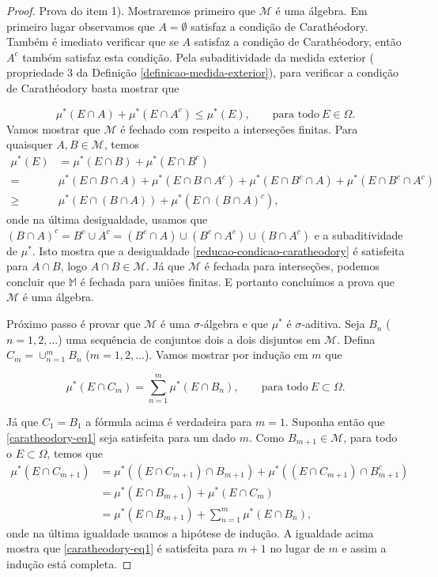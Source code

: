 \begin{proof}
Prova do item 1). Mostraremos primeiro que $\mathcal{M}$ é uma álgebra.
Em primeiro lugar observamos que $A=\emptyset$ satisfaz 
a condição de Carathéodory. Também é imediato verificar que se $A$ 
satisfaz a condição de Carathéodory, então $A^c$ também satisfaz esta condição. 
Pela subaditividade da medida exterior ( propriedade 3 da Definição \ref{definicao-medida-exterior}), 
para verificar a condição de Carathéodory basta mostrar que 

\begin{equation}\label{reducao-condicao-caratheodory}
\mu^*(E\cap A)+\mu^*(E\cap A^c)\leq \mu^*(E),
\qquad
\text{para todo}\ E\in\Omega.
\end{equation}
Vamos mostrar que $\mathcal{M}$ é fechado com respeito a interseções finitas. 
Para quaisquer $A,B\in\mathcal{M}$, temos
\begin{align*}
\mu^*(E) &= \mu^*(E\cap B) + \mu^*(E\cap B^c) \qquad 
\\
=& \mu^*(E\cap B\cap A)+\mu^*(E\cap B\cap A^c) + \mu^*(E\cap B^c\cap A)+ \mu^*(E\cap B^c\cap A^c)
\\
\geq & \mu^*(E\cap(B\cap A))+\mu^*(E\cap(B\cap A)^c),
\end{align*}
onde na última desigualdade, usamos que 
$(B\cap A)^c=B^c\cup A^c = (B^c\cap A) \cup (B^c\cap A^c) \cup (B\cap A^c)$
e a subaditividade de $\mu^*$. Isto mostra que a desigualdade 
\eqref{reducao-condicao-caratheodory} é satisfeita para $A\cap B$, logo 
$A\cap B\in \mathcal{M}$. Já que $\mathcal{M}$ é fechada para interseções,
podemos concluir que $\mathbb{M}$ é fechada para uniões finitas.
E portanto concluímos a prova que $\mathcal{M}$ é uma álgebra.

Próximo passo é provar que $\mathcal{M}$ é uma $\sigma$-álgebra e
que $\mu^*$ é $\sigma$-aditiva. 
Seja $B_n$ ($n=1,2,\ldots$) uma sequência de conjuntos dois a 
dois disjuntos em $\mathcal{M}$. 
Defina $C_m = \cup_{n=1}^m B_n$ ($m=1,2,\ldots$).
Vamos mostrar por indução em $m$ que 

\begin{equation} \label{caratheodory-eq1}
    \mu^*(E\cap C_m) = \sum_{n=1}^m \mu^*(E\cap B_n), 
    \qquad \text{para todo} \ E\subset\Omega.
\end{equation}

Já que $C_1=B_1$ a fórmula acima é verdadeira para $m=1$. Suponha então que 
\eqref{caratheodory-eq1} seja satisfeita para um dado $m$. Como $B_{m+1} \in  \mathcal{M}$,
para todo o $ E \subset \Omega $, temos que
\begin{align*}
    \mu^*(E \cap C_{m+1}) & = \mu^*((E \cap C_{m+1})\cap B_{m+1}) + 
    \mu^*((E \cap C_{m+1})\cap B^c_{m+1})\\
    & = \mu^*(E \cap B_{m+1}) + \mu^*(E\cap C_{m})\\
    & = \mu^*(E \cap B_{m+1}) + \sum_{n=1}^m \mu^*(E\cap B_n),
\end{align*}
onde na última igualdade usamos a hipótese de indução. 
A igualdade acima mostra que \eqref{caratheodory-eq1} 
é satisfeita para $m+1$ no lugar de $m$ e assim a indução está completa. 



\end{proof}
